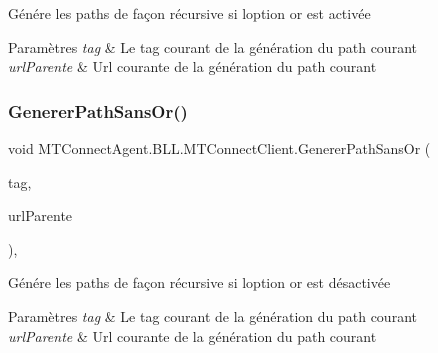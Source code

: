 Génére les paths de façon récursive si l\textquotesingle{}option or est activée 


\begin{DoxyParams}{Paramètres}
{\em tag} & Le tag courant de la génération du path courant\\
\hline
{\em url\+Parente} & Url courante de la génération du path courant\\
\hline
\end{DoxyParams}
\mbox{\label{class_m_t_connect_agent_1_1_b_l_l_1_1_m_t_connect_client_a49be318d688f99f3fe6596c74eba7ca1}} 
\subsubsection{\texorpdfstring{Generer\+Path\+Sans\+Or()}{GenererPathSansOr()}}
{\footnotesize\ttfamily void M\+T\+Connect\+Agent.\+B\+L\+L.\+M\+T\+Connect\+Client.\+Generer\+Path\+Sans\+Or (\begin{DoxyParamCaption}\item[{\mbox{\hyperlink{class_m_t_connect_agent_1_1_model_1_1_tag}{Tag}}}]{tag,  }\item[{string}]{url\+Parente }\end{DoxyParamCaption})\hspace{0.3cm}{\ttfamily [inline]}, {\ttfamily [private]}}



Génére les paths de façon récursive si l\textquotesingle{}option or est désactivée 


\begin{DoxyParams}{Paramètres}
{\em tag} & Le tag courant de la génération du path courant\\
\hline
{\em url\+Parente} & Url courante de la génération du path courant\\
\hline
\end{DoxyParams}
\mbox{\label{class_m_t_connect_agent_1_1_b_l_l_1_1_m_t_connect_client_a70ce6301ae2f75b317c73b4a35660e41}} 

